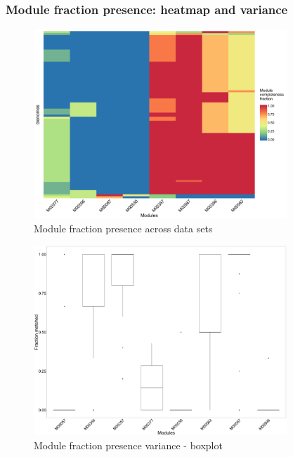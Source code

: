 \documentclass{article}
\begin{document}
\subsubsection*{Module fraction presence: heatmap and variance}
\begin{figure}\centering
\includegraphics[width=0.85\textwidth]{module_allOrgs.png}
\caption{Module fraction presence across data sets}\label{fig:module_allOrgs.png}\end{figure}
\begin{figure}\centering
\includegraphics[width=0.85\textwidth]{module_allOrgs_sd_boxplot.png}
\caption{Module fraction presence variance - boxplot}\label{fig:module_allOrgs_sd_boxplot.png}\end{figure}
\end{document}
